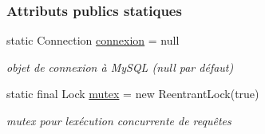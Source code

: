 \subsubsection*{Attributs publics statiques}
\begin{DoxyCompactItemize}
\item 
static Connection \hyperlink{classfr_1_1campus_1_1laurainc_1_1honeybee_1_1_base_de_donnees_a358899633f17b8cd00dd2c4cfdd40abe}{connexion} = null
\begin{DoxyCompactList}\small\item\em objet de connexion à My\+S\+QL (null par défaut) \end{DoxyCompactList}\item 
static final Lock \hyperlink{classfr_1_1campus_1_1laurainc_1_1honeybee_1_1_base_de_donnees_a0dd6f285a11459c086adea6080bed282}{mutex} = new Reentrant\+Lock(true)
\begin{DoxyCompactList}\small\item\em mutex pour l\textquotesingle{}exécution concurrente de requêtes \end{DoxyCompactList}\end{DoxyCompactItemize}
